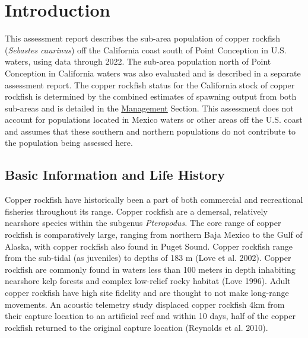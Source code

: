 \documentclass[11pt,
  english,
  letterpaper,
]{article}
\begin{document}
\pagebreak
\setlength{\parskip}{5mm plus1mm minus1mm}
\setcounter{page}{1}
\renewcommand{\thefigure}{\arabic{figure}}
\renewcommand{\thetable}{\arabic{table}}
\setcounter{table}{0}
\setcounter{figure}{0}

\hypertarget{introduction}{%
\section{Introduction}\label{introduction}}

This assessment report describes the sub-area population of copper rockfish (\emph{Sebastes caurinus}) off the California coast south of Point Conception in U.S. waters, using data through 2022. The sub-area population north of Point Conception in California waters was also evaluated and is described in a separate assessment report. The copper rockfish status for the California stock of copper rockfish is determined by the combined estimates of spawning output from both sub-areas and is detailed in the \protect\hyperlink{management}{Management} Section. This assessment does not account for populations located in Mexico waters or other areas off the U.S. coast and assumes that these southern and northern populations do not contribute to the population being assessed here.

\hypertarget{basic-information-and-life-history}{%
\subsection{Basic Information and Life History}\label{basic-information-and-life-history}}

Copper rockfish have historically been a part of both commercial and recreational fisheries throughout its range. Copper rockfish are a demersal, relatively nearshore species within the subgenus \emph{Pteropodus.} The core range of copper rockfish is comparatively large, ranging from northern Baja Mexico to the Gulf of Alaska, with copper rockfish also found in Puget Sound. Copper rockfish range from the sub-tidal (as juveniles) to depths of 183 m (Love et al. 2002). Copper rockfish are commonly found in waters less than 100 meters in depth inhabiting nearshore kelp forests and complex low-relief rocky habitat (Love 1996). Adult copper rockfish have high site fidelity and are thought to not make long-range movements. An acoustic telemetry study displaced copper rockfish 4km from their capture location to an artificial reef and within 10 days, half of the copper rockfish returned to the original capture location (Reynolds et al. 2010).
\end{document}
